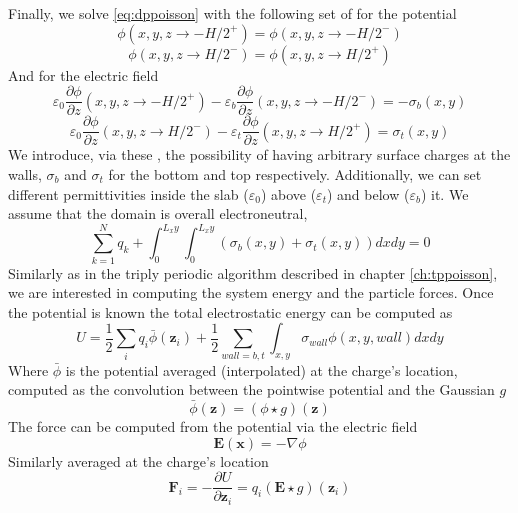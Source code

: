 \documentclass[ twoside,openright,titlepage,numbers=noenddot,%
headinclude,footinclude,cleardoublepage=empty,abstract=on,
BCOR=5mm,paper=a4,fontsize=11pt, dvipsnames
]{scrreprt}
\renewcommand{\vec}[1]{\bm{#1}}
\begin{document}
Finally, we solve \eqref{eq:dppoisson} with the following set of \bcs for the potential
\begin{equation}\phi(x,y,z\rightarrow -H/2^+)=\phi(x,y,z\rightarrow -H/2^-)\label{eq:dppoissonbcs1}\end{equation}  
\begin{equation}\phi(x,y,z\rightarrow H/2^-)=\phi(x,y,z\rightarrow H/2^+)\label{eq:dppoissonbcs2}\end{equation}
And for the electric field 
\begin{equation}\varepsilon_0 \frac{\partial \phi}{\partial z}(x,y,z\rightarrow -H/2^+)-\varepsilon_b \frac{\partial \phi}{\partial z}(x,y,z\rightarrow -H/2^-)=-\sigma_b(x,y)\label{eq:dppoissonbcs3}\end{equation}  
\begin{equation}\varepsilon_0 \frac{\partial \phi}{\partial z}(x,y,z\rightarrow H/2^-)-\varepsilon_t \frac{\partial \phi}{\partial z}(x,y,z\rightarrow H/2^+)=\sigma_t(x,y)\label{eq:dppoissonbcs4}\end{equation} 
We introduce, via these \bcs, the possibility of having arbitrary surface charges at the walls, $\sigma_b$ and $\sigma_t$ for the bottom and top respectively. Additionally, we can set different permittivities inside the slab ($\varepsilon_0$) above ($\varepsilon_t$) and below ($\varepsilon_b$) it.
We assume that the domain is overall electroneutral,
\begin{equation}
  \label{eq:dppoisson_electroneutral}
  \sum_{k=1}^N{q_k} + \int_0^{L_xy}{\int_0^{L_xy}{(\sigma_b(x,y) + \sigma_t(x,y))dxdy}} = 0
\end{equation}
Similarly as in the triply periodic algorithm described in chapter \ref{ch:tppoisson}, we are interested in computing the system energy and the particle forces.
Once the potential is known the total electrostatic energy can be computed as
\begin{equation}
  \label{eq:dppu}
  U = \frac{1}{2}\sum_i{q_i\bar\phi(\vec{z}_i)} + \frac{1}{2}\sum_{wall=b,t}{\int_{x,y}{\sigma_{wall}\phi(x,y,wall)dxdy}}
\end{equation}
Where $\bar\phi$ is the potential averaged (interpolated) at the charge's location, computed as the convolution between the pointwise potential and the Gaussian $g$
\begin{equation}
  \label{eq:dpphibar}
  \bar\phi(\vec{z}) = (\phi\star g)(\vec{z})
\end{equation}
The force can be computed from the potential via the electric field
\begin{equation}
  \label{eq:dppE}
  \vec{E}(\vec{x}) = -\nabla{\phi}  
\end{equation}
Similarly averaged at the charge's location
\begin{equation}
  \label{eq:dppf}
  \vec{F}_i = -\frac{\partial U}{\partial\vec{z}_i} = q_i(\vec{E}\star g)(\vec{z}_i)
\end{equation}
\end{document}
